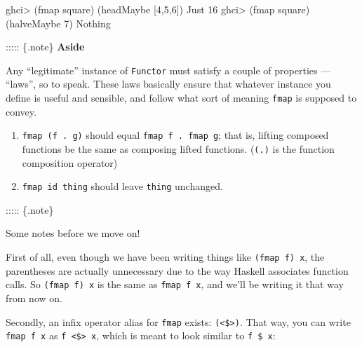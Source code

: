 \documentclass[]{article}
\newenvironment{Shaded}{}{}
\newcommand{\DataTypeTok}[1]{\textcolor[rgb]{0.56,0.13,0.00}{#1}}
\newcommand{\DecValTok}[1]{\textcolor[rgb]{0.25,0.63,0.44}{#1}}
\newcommand{\FunctionTok}[1]{\textcolor[rgb]{0.02,0.16,0.49}{#1}}
\newcommand{\NormalTok}[1]{#1}
\begin{document}
\begin{Shaded}
\begin{Highlighting}[]
\NormalTok{ghci}\FunctionTok{>}\NormalTok{ (fmap square) (headMaybe [}\DecValTok{4}\NormalTok{,}\DecValTok{5}\NormalTok{,}\DecValTok{6}\NormalTok{])}
\DataTypeTok{Just} \DecValTok{16}
\NormalTok{ghci}\FunctionTok{>}\NormalTok{ (fmap square) (halveMaybe }\DecValTok{7}\NormalTok{)}
\DataTypeTok{Nothing}
\end{Highlighting}
\end{Shaded}

::::: \{.note\} \textbf{Aside}

Any ``legitimate'' instance of \texttt{Functor} must satisfy a couple of
properties --- ``laws'', so to speak. These laws basically ensure that whatever
instance you define is useful and sensible, and follow what sort of meaning
\texttt{fmap} is supposed to convey.

\begin{enumerate}
\def\labelenumi{\arabic{enumi}.}
\tightlist
\item
  \texttt{fmap\ (f\ .\ g)} should equal \texttt{fmap\ f\ .\ fmap\ g}; that is,
  lifting composed functions be the same as composing lifted functions.
  (\texttt{(.)} is the function composition operator)
\item
  \texttt{fmap\ id\ thing} should leave \texttt{thing} unchanged.
\end{enumerate}

::::: \{.note\}

Some notes before we move on!

First of all, even though we have been writing things like
\texttt{(fmap\ f)\ x}, the parentheses are actually unnecessary due to the way
Haskell associates function calls. So \texttt{(fmap\ f)\ x} is the same as
\texttt{fmap\ f\ x}, and we'll be writing it that way from now on.

Secondly, an infix operator alias for \texttt{fmap} exists:
\texttt{(\textless{}\$\textgreater{})}. That way, you can write
\texttt{fmap\ f\ x} as \texttt{f\ \textless{}\$\textgreater{}\ x}, which is
meant to look similar to \texttt{f\ \$\ x}:

\begin{Shaded}
\end{Shaded}
\end{document}
